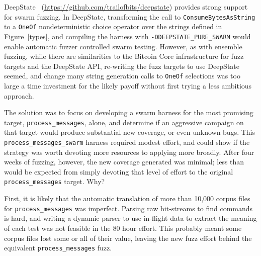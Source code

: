 \begin{sloppypar}
DeepState~\cite{goodman2018deepstate} (\url{https://github.com/trailofbits/deepstate}) provides strong support for swarm fuzzing.  In DeepState, transforming the call to {\tt ConsumeBytesAsString} to a {\tt OneOf} nondeterministic choice operator over the strings defined in Figure~\ref{types}, and compiling the harness with {\tt -DDEEPSTATE\_PURE\_SWARM} would enable automatic fuzzer controlled swarm testing. However, as with ensemble fuzzing, while there are similarities to the Bitcoin Core infrastructure for fuzz targets and the DeepState API, re-writing the fuzz targets to use DeepState seemed, and change many string generation calls to {\tt OneOf} selections was too large a time investment for the likely payoff without first trying a less ambitious approach.

The solution was to focus on developing a swarm harness for the most promising target, {\tt process\_messages}, alone, and determine if an aggressive campaign on that target would produce substantial new coverage, or even unknown bugs. This {\tt process\_messages\_swarm} harness required modest effort, and could show if the strategy was worth devoting more resources to applying more broadly.  After four weeks of fuzzing, however, the new coverage generated was minimal; less than would be expected from simply devoting that level of effort to the original {\tt process\_messages} target.  Why?

First, it is likely that the automatic translation of more than 10,000 corpus files for {\tt process\_messages} was imperfect.  Parsing raw bit-streams to find commands is hard, and writing a dynamic parser to use in-flight data to extract the meaning of each test was not feasible in the 80 hour effort.  This probably meant some corpus files lost some or all of their value, leaving the new fuzz effort behind the equivalent {\tt process\_messages} fuzz.


\end{sloppypar}
